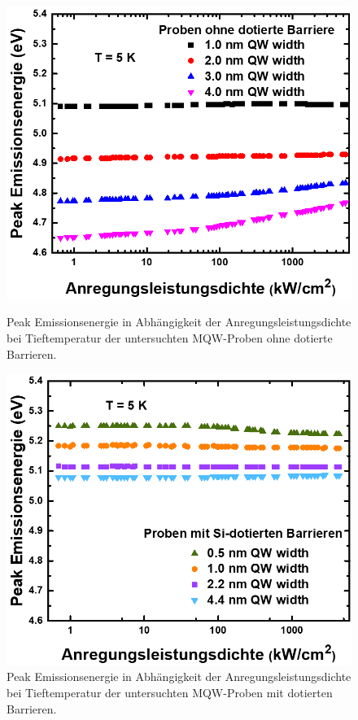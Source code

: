 \begin{figure}[H]
  \centering
  \begin{minipage}[t]{0.49\textwidth}
    \centering
    \includegraphics[width=\textwidth]{Bilder/MQWdickenSerie/PeakEnergieUndotiert.png}
		\caption{Peak Emissionsenergie in Abhängigkeit der Anregungsleistungsdichte bei Tieftemperatur der untersuchten MQW-Proben ohne dotierte Barrieren.}
    \label{fig:undotiertpeak}
  \end{minipage}
	\hfill
  \begin{minipage}[t]{0.49\textwidth}
    \centering
    \includegraphics[width=\linewidth]{Bilder/MQWdickenSerie/PeakEnergieDotiert.png}
		\caption{Peak Emissionsenergie in Abhängigkeit der Anregungsleistungsdichte bei Tieftemperatur der untersuchten MQW-Proben mit dotierten Barrieren.}
    \label{fig:dotiertpeak}
  \end{minipage}
\end{figure}
